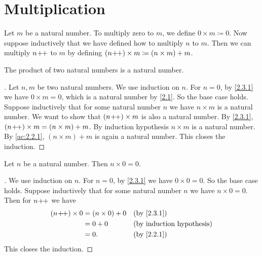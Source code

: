 \section{Multiplication}\label{sec:2.3}

\begin{defn}\label{2.3.1}
  Let \(m\) be a natural number.
  To multiply zero to \(m\), we define \(0 \times m \coloneqq 0\).
  Now suppose inductively that we have defined how to multiply \(n\) to \(m\).
  Then we can multiply \(n\!+\!\!+\) to \(m\) by defining \((n\!+\!\!+) \times m \coloneqq (n \times m) + m\).
\end{defn}

\begin{ac}\label{ac:2.3.1}
  The product of two natural numbers is a natural number.
\end{ac}

\begin{proof}[]
  Let \(n, m\) be two natural numbers.
  We use induction on \(n\).
  For \(n = 0\), by \cref{2.3.1} we have \(0 \times m = 0\), which is a natural number by \cref{2.1}.
  So the base case holds.
  Suppose inductively that for some natural number \(n\) we have \(n \times m\) is a natural number.
  We want to show that \((n\!+\!\!+) \times m\) is also a natural number.
  By \cref{2.3.1}, \((n\!+\!\!+) \times m = (n \times m) + m\).
  By induction hypothesis \(n \times m\) is a natural number.
  By \cref{ac:2.2.1}, \((n \times m) + m\) is again a natural number.
  This closes the induction.
\end{proof}

\begin{ac}\label{ac:2.3.2}
  Let \(n\) be a natural number.
  Then \(n \times 0 = 0\).
\end{ac}

\begin{proof}[]
  We use induction on \(n\).
  For \(n = 0\), by \cref{2.3.1} we have \(0 \times 0 = 0\).
  So the base case holds.
  Suppose inductively that for some natural number \(n\) we have \(n \times 0 = 0\).
  Then for \(n\!+\!\!+\) we have
  \begin{align*}
    (n\pp) \times 0 & = (n \times 0) + 0 &  & \by{2.3.1} \\
                    & = 0 + 0            &  & \byIH      \\
                    & = 0.               &  & \by{2.2.1}
  \end{align*}
  This closes the induction.
\end{proof}

